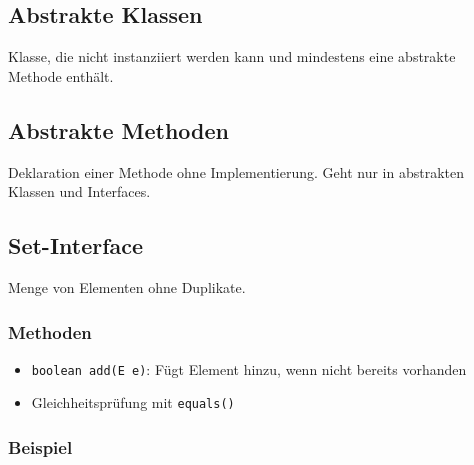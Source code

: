 \begin{minipage}[t]{0.52\columnwidth}
    \subsection{Abstrakte Klassen}
    Klasse, die nicht instanziiert werden kann und mindestens eine abstrakte Methode enthält.
\end{minipage}\hfill
\begin{minipage}[t]{0.45\columnwidth}
    \subsection{Abstrakte Methoden}
    Deklaration einer Methode ohne Implementierung. Geht nur in abstrakten Klassen und Interfaces.
    
\end{minipage}

\vspace{-7mm}
\subsection{Set-Interface}
Menge von Elementen ohne Duplikate.
\subsubsection{Methoden}
\begin{itemize}
    \item \lstinline{boolean add(E e)}: Fügt Element hinzu, wenn nicht bereits vorhanden
    \item Gleichheitsprüfung mit \lstinline{equals()}
\end{itemize}

\subsubsection{Beispiel}

